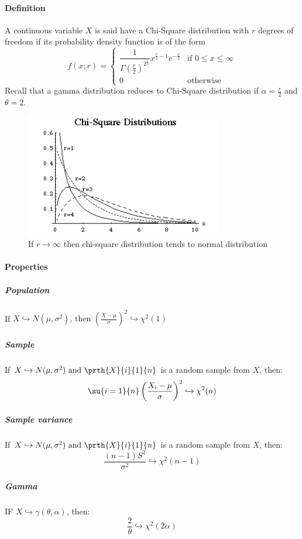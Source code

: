 \paragraph{Definition}
A continuous variable $X$ is said have a Chi-Square distribution with
$r$ degrees of freedom if its probability density function is of the form
$$
f(x;r)=
\left\{
\begin{array}{ll}
\dfrac{1}{\Gamma\left(\frac{r}{2}\right)^{2^{\frac{r}{2}}}}x^{\frac{r}{2}-1}e^{-\frac{x}{2}} & \mbox{if } 0 \leq x\leq \infty \\
0 & \mbox{otherwise}
\end{array}
\right.
$$
Recall that a gamma distribution reduces to Chi-Square distribution if 
$\alpha = \frac{r}{2}$ and $\theta = 2$.
\begin{figure}[H]
	\begin{center}
		\includegraphics[width=\textwidth]{./chaps/23sec/images/1chi_square.png}
	\end{center}
	\caption{If $r\rightarrow\infty$ then chi-square distribution
	tends to normal distribution}
	\label{fig:23sec_chiSquared}
\end{figure}

\paragraph{Properties}
\subparagraph{Population}
If $X\hookrightarrow N(\mu, \sigma^{2}) \text{, then }\left( \frac{X-\mu}{\sigma} \right)^{2}\hookrightarrow\chi^{2}(1)$
\subparagraph{Sample} If $X\hookrightarrow N(\mu,\sigma^{2})\text{ and }\prth{X}{i}{1}{n}$ is a random sample from $X$, then:\\
$$ \su{{i=1}}{n}\left( \dfrac{X_{i}-\mu}{\sigma} \right)^{2}\hookrightarrow\chi^{2}(n)$$
\subparagraph{Sample variance} If $X\hookrightarrow N(\mu,\sigma^{2})\text{ and }\prth{X}{i}{1}{n}$ is a random sample from $X$, then:\\
$$ \dfrac{(n-1)S^{2}}{\sigma^{2}}\hookrightarrow\chi^{2}(n-1)$$
\subparagraph{Gamma} IF $X\hookrightarrow \gamma(\theta,\alpha)$, then:
$$ \dfrac{2}{\theta}\hookrightarrow\chi^{2}(2\alpha)$$
